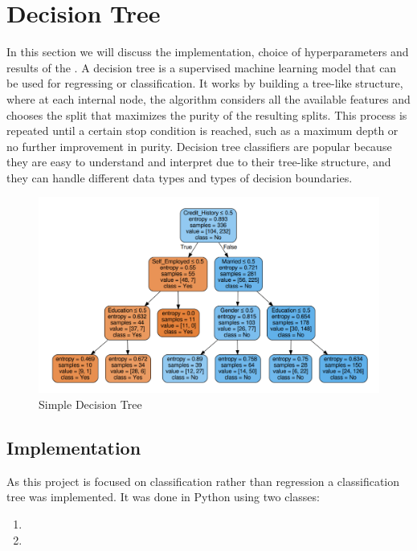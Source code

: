 \section{Decision Tree}
In this section we will discuss the implementation, choice of hyperparameters and results of the .
A decision tree is a supervised machine learning model that can be used for regressing or classification.
It works by building a tree-like structure, where at each internal node, the algorithm considers all the available features and chooses the split that maximizes the purity of the resulting splits.
This process is repeated until a certain stop condition is reached, such as a maximum depth or no further improvement in purity.
Decision tree classifiers are popular because they are easy to understand and interpret due to their tree-like structure, and they can handle different data types and types of decision boundaries. \\

\begin{figure}[H]
    \centering
    \includegraphics[scale=0.25]{figures_for_report/example_decision_tree}
    \captionsetup{justification=centering,margin=2cm}
    \caption{Simple Decision Tree}
\end{figure}


\subsection{Implementation}
As this project is focused on classification rather than regression a classification tree was implemented.
It was done in Python using two classes:
\begin{enumerate}
    \item {}
    \item {}
    \end{enumerate}
\vspace{10pt}

